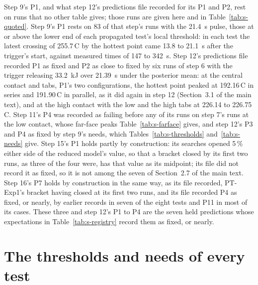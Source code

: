 \documentclass[preprint,12pt]{elsarticle}
\newcommand{\degC}{\,\textdegree C}
\begin{document}
Step 9's P1, and what step 12's predictions file recorded for its P1 and P2, rest on runs that no other table gives; those runs are given here and in Table~\ref{tab:s-quoted}. Step 9's P1 rests on 83 of that step's runs with the 21.4~s pulse, those at or above the lower end of each propagated test's local threshold: in each test the latest crossing of 255.7\degC{} by the hottest point came 13.8 to 21.1~s after the trigger's start, against measured times of 147 to 342~s. Step 12's predictions file recorded P1 as fixed and P2 as close to fixed by six runs of step 6 with the trigger releasing 33.2~kJ over 21.39~s under the posterior mean: at the central contact and tabs, P1's two configurations, the hottest point peaked at 192.16\degC{} in series and 191.90\degC{} in parallel, as it did again in step 12 (Section~3.1 of the main text), and at the high contact with the low and the high tabs at 226.14 to 226.75\degC. Step 11's P4 was recorded as failing before any of its runs on step 7's runs at the low contact, whose far-face peaks Table~\ref{tab:s-farface} gives, and step 12's P3 and P4 as fixed by step 9's needs, which Tables~\ref{tab:s-thresholds} and~\ref{tab:s-needs} give. Step 15's P1 holds partly by construction: its searches opened 5\,\% either side of the reduced model's value, so that a bracket closed by its first two runs, as three of the four were, has that value as its midpoint; its file did not record it as fixed, so it is not among the seven of Section~2.7 of the main text. Step 16's P7 holds by construction in the same way, as its file recorded, PT-Exp1's bracket having closed at its first two runs, and its file recorded P4 as fixed, or nearly, by earlier records in seven of the eight tests and P11 in most of its cases. These three and step 12's P1 to P4 are the seven held predictions whose expectations in Table~\ref{tab:s-registry} record them as fixed, or nearly.


\section{The thresholds and needs of every test}
\label{sec:s-thresholds}
\end{document}
